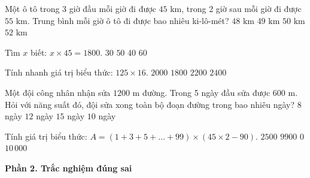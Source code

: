 \begin{ex} %
Một ô tô trong 3 giờ đầu mỗi giờ đi được $45\text{ km}$, trong 2 giờ sau mỗi giờ đi được $55\text{ km}$. Trung bình mỗi giờ ô tô đi được bao nhiêu ki-lô-mét?
\choice
{$48\text{ km}$}
{\True $49\text{ km}$}
{$50\text{ km}$}
{$52\text{ km}$}
\end{ex}

\begin{ex} %
Tìm $x$ biết: $x \times 45 = 1800$.
\choice
{$30$}
{$50$}
{\True $40$}
{$60$}
\end{ex}

\begin{ex} %
Tính nhanh giá trị biểu thức: $125 \times 16$.
\choice
{\True $2000$}
{$1800$}
{$2200$}
{$2400$}
\end{ex}

\begin{ex} %
Một đội công nhân nhận sửa $1200\text{ m}$ đường. Trong 5 ngày đầu sửa được $600\text{ m}$. Hỏi với năng suất đó, đội sửa xong toàn bộ đoạn đường trong bao nhiêu ngày?
\choice
{$8$ ngày}
{$12$ ngày}
{$15$ ngày}
{\True $10$ ngày}
\end{ex}

\begin{ex} %
Tính giá trị biểu thức: $A = (1 + 3 + 5 + \dots + 99) \times (45 \times 2 - 90)$.
\choice
{$2500$}
{$9900$}
{\True $0$}
{$10\,000$}
\end{ex}

\textbf{Phần 2. Trắc nghiệm đúng sai}

